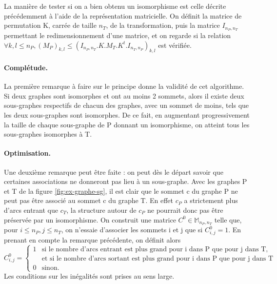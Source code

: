 La manière de tester si on a bien obtenu un isomorphisme est celle décrite précédemment à l'aide de la représentation matricielle.
On définit la matrice de permutation K, carrée de taille $n_T$, de la transformation,
puis la matrice $I_{n_P, n_T}$ permettant le redimensionnement d'une matrice, et on regarde si la relation $\forall k,l\leq n_P, (M_P)_{k,l}\leq (I_{n_P, n_T}.K.M_T.K^t.I_{n_T, n_P})_{k,l}$ est
vérifiée.
\\

\paragraph{Complétude.}
La première remarque à faire sur le principe donne la validité de cet algorithme. Si deux graphes sont isomorphes et ont au moins 2 sommets,
alors il existe deux sous-graphes respectifs de chacun des graphes, avec un sommet de moins, tels que les deux sous-graphes sont isomorphes.
De ce fait, en augmentant progressivement la taille de chaque sous-graphe de P donnant un isomorphisme, on atteint tous les sous-graphes isomorphes à T.


\paragraph{Optimisation.}
Une deuxième remarque peut être faite : on peut dès le départ savoir que certaines associations ne donneront pas lieu à un sous-graphe. Avec les graphes P et T
de la figure \ref{fig:ex-graphe-sg}, il est clair que le sommet c du graphe P ne peut pas être associé au sommet c du graphe T. En effet $c_P$ a strictement plus d'arcs
entrant que $c_T$, la structure autour de $c_P$ ne pourrait donc pas être préservée par un isomorphisme. On construit une matrice $C^0 \in \mathbb{M}_{n_P, n_T}$ telle que, pour
$i\le n_P, j\le n_T$, on n'essaie d'associer les sommets i et j que si $C^0_{i, j}=1$. En prenant en compte la remarque précédente, on définit alors
\\

$C^0_{i, j} = \left\{
  \begin{array}{ll}
	  1 & \mbox{si le nombre d'arcs entrant est plus grand pour i dans P que pour j dans T,} \\
	    &  \mbox{et si le nombre d'arcs sortant est plus grand pour i dans P que pour j dans T}
	\\0 & \mbox{sinon.}
  \end{array}
\right.
$
\\
Les conditions sur les inégalités sont prises au sens large.
\\

